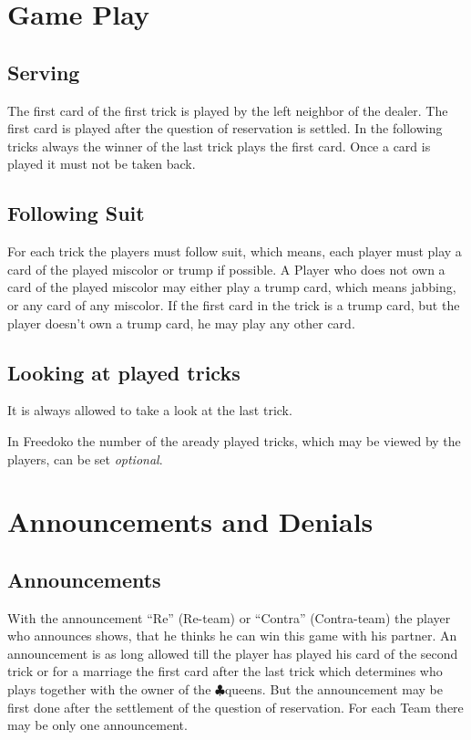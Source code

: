 \documentclass[12pt,a4paper]{article}
\newcommand{\kreuz}{$\clubsuit$}
\newcommand{\optional}{\textit{optional}}
\begin{document}
\section{Game Play}
\subsection{Serving} The first card of the first trick is played
by the left neighbor of the dealer. The first card is played
after the question of reservation is settled. In the following
tricks always the winner of the last trick plays the first card.
Once a card is played it must not be taken back.
\subsection{Following Suit} For each trick the players must
follow suit, which means, each player must play a card of the
played miscolor or trump if possible. A Player who does not own a
card of the played miscolor may either play a trump card, which
means jabbing, or any card of any miscolor. If the first card in
the trick is a trump card, but the player doesn't own a trump
card, he may play any other card.
\subsection{Looking at played tricks}
It is always allowed to take a look at the last trick.

In Freedoko the number of the aready played tricks, which may be viewed by the
players, can be set \optional.
\section{Announcements and Denials}
\subsection{Announcements} With the announcement "`Re"'
(Re-team) or "`Contra"' (Contra-team) the player who announces
shows, that he thinks he can win this game with his partner. An
announcement is as long allowed till the player has played his
card of the second trick or for a marriage the first card after
the last trick which determines who plays together with the owner
of the \kreuz queens. But the announcement may be first done after
the settlement of the question of reservation. For each Team
there may be only one announcement.
\end{document}
